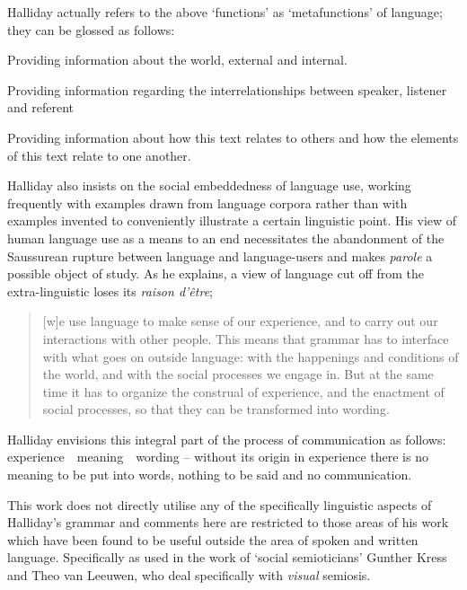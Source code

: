 Halliday actually refers to the above `functions' as `metafunctions' of language; they can be glossed as follows:

\begin{close_descrip}
\item[Ideational] Providing information about the world, external and internal.
\item[Inter-personal] Providing information regarding the interrelationships between speaker, listener and referent 
\item[Textual] Providing information about how this text relates to others and how the elements of this text relate to one another.
\label{list:metafuncs}
\citep[588-590]{Halliday:2004}
\end{close_descrip}

Halliday also insists on the social embeddedness of language use, working frequently with examples drawn from language corpora rather than with examples invented to conveniently illustrate a certain linguistic point. His view of human language use as a means to an end necessitates the abandonment of the Saussurean rupture between language and language-users and makes \emph{parole} a possible object of study. As he explains, a view of language cut off from the extra-linguistic loses its \emph{raison d'\^{e}tre};

\begin{quote}
[w]e use language to make sense of our experience, and to carry out our interactions with other people. This means that grammar has to interface with what goes on outside language: with the happenings and conditions of the world, and with the social processes we engage in. But at the same time it has to organize the construal of experience, and the enactment of social processes, so that they can be transformed into wording. \citep[24-5]{Halliday:2004}
\end{quote}

Halliday envisions this integral part of the process of communication as follows: experience~\textrightarrow~meaning~\textrightarrow~wording -- without its origin in experience there is no meaning to be put into words, nothing to be said and no communication. 

This work does not directly utilise any of the specifically linguistic aspects of Halliday's grammar and comments here are restricted to those areas of his work which have been found to be useful outside the area of spoken and written language. Specifically as used in the work of `social semioticians' Gunther Kress and Theo van Leeuwen, who deal specifically with \textit{visual} semiosis. 

